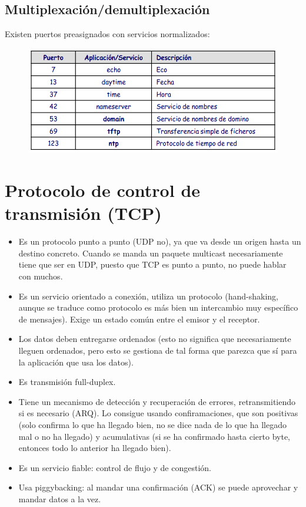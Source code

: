 \subsection{Multiplexación/demultiplexación}
Existen puertos preasignados con servicios normalizados:
\begin{figure}[H]
    \centering
    \includegraphics[width=0.6\linewidth]{./images/puertos-udp.png}
\end{figure}


\section{Protocolo de control de transmisión (TCP)}
\begin{itemize}
    \item Es un protocolo punto a punto (UDP no), ya que va desde un origen hasta un destino concreto. Cuando se manda un paquete multicast necesariamente tiene que ser en UDP, puesto que TCP es punto a punto, no puede hablar con muchos. 
    \item Es un servicio orientado a conexión, utiliza un protocolo (hand-shaking, aunque se traduce como protocolo es más bien un intercambio muy específico de mensajes). Exige un estado común entre el emisor y el receptor.
    \item Los datos deben entregarse ordenados (esto no significa que necesariamente lleguen ordenados, pero esto se gestiona de tal forma que parezca que sí para la aplicación que usa los datos).
    \item Es transmisión full-duplex.
    \item Tiene un mecanismo de detección y recuperación de errores, retransmitiendo si es necesario (ARQ). Lo consigue usando confiramaciones, que son positivas (solo confirma lo que ha llegado bien, no se dice nada de lo que ha llegado mal o no ha llegado) y acumulativas (si se ha confirmado hasta cierto byte, entonces todo lo anterior ha llegado bien).
    \item Es un servicio fiable: control de flujo y de congestión.
    \item Usa piggybacking: al mandar una confirmación (ACK) se puede aprovechar y mandar datos a la vez.
\end{itemize}

